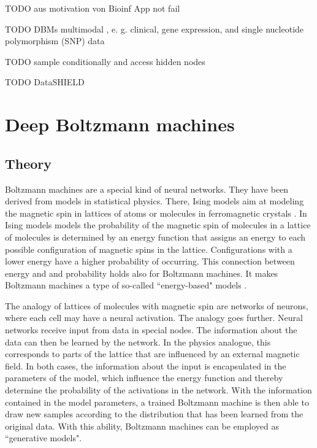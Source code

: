 \documentclass[12pt]{article}
\begin{document}

TODO aus motivation von Bioinf App not fail

TODO DBMs multimodal , e. g. clinical, gene expression, and single nucleotide polymorphism (SNP) data

TODO sample conditionally and access hidden nodes

TODO DataSHIELD \citep{gaye_datashield,budin-ljosne_datashield}

\clearpage
\section{Deep Boltzmann machines}
\subsection{Theory}\label{bmtheory}

Boltzmann machines \citep{ackley_boltzmann_1985} are a special kind of neural networks.
They have been derived from models in statistical physics.
There, Ising models aim at modeling the magnetic spin in lattices of atoms or molecules in ferromagnetic crystals \citep{isingmodel}.
In Ising models models the probability of the magnetic spin of molecules in a lattice of molecules is determined by an energy function that assigns an energy to each possible configuration of magnetic spins in the lattice.
Configurations with a lower energy have a higher probability of occurring.
This connection between energy and and probability holds also for Boltzmann machines.
It makes Boltzmann machines a type of so-called ``energy-based" models \citep{ranzato_ebm}.

The analogy of lattices of molecules with magnetic spin are networks of neurons, where each cell may have a neural activation.
The analogy goes further.
Neural networks receive input from data in special nodes.
The information about the data can then be learned by the network.
In the physics analogue, this corresponds to parts of the lattice that are influenced by an external magnetic field.
In both cases, the information about the input is encapsulated in the parameters of the model, which influence the energy function and thereby determine the probability of the activations in the network.
With the information contained in the model parameters, a trained Boltzmann machine is then able to draw new samples according to the distribution that has been learned from the original data.
With this ability, Boltzmann machines can be employed as ``generative models".
\end{document}
